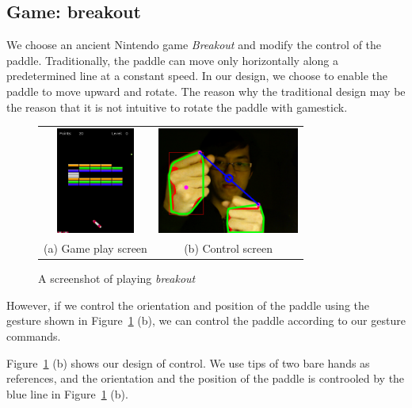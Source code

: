 \documentclass[10pt,twocolumn,letterpaper]{article}
\begin{document}
\subsection{Game: breakout}
We choose an ancient Nintendo game \emph{Breakout} and modify 
the control of the paddle. Traditionally, the paddle can 
move only horizontally along a predetermined line at a constant speed.
In our design, we choose to enable the paddle to move upward and rotate.
The reason why the traditional design may be the reason that 
it is not intuitive to rotate the paddle with gamestick.
\begin{figure}[h]
\centering
\begin{tabular}{cc}
\includegraphics[height=3.5cm]{game0060.png} &
\includegraphics[height=3.5cm]{gesture0060.png} \\
(a) Game play screen &
(b) Control screen
\end{tabular}
\caption{A screenshot of playing \emph{breakout}}
\label{fig:gamescreen}
\end{figure}

However, if we control the orientation and position of the paddle 
using the gesture shown in Figure~\ref{fig:gamescreen} (b), 
we can control the paddle according to our gesture commands.

Figure~\ref{fig:gamescreen} (b) shows our design of control. 
We use tips of two bare hands as references, and the orientation and 
the position of the paddle is controoled by the blue line in 
Figure~\ref{fig:gamescreen} (b).
\end{document}
